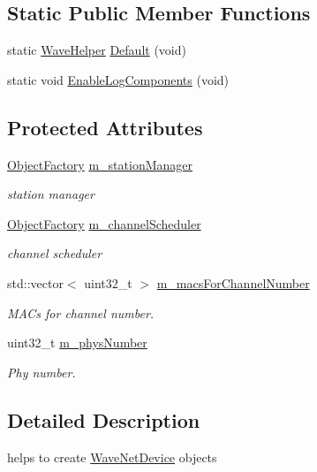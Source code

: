 \subsection*{Static Public Member Functions}
\begin{DoxyCompactItemize}
\item 
static \hyperlink{classns3_1_1WaveHelper}{Wave\+Helper} \hyperlink{classns3_1_1WaveHelper_aa3b90ecb4657cdeaf77e67532dd2e690}{Default} (void)
\item 
static void \hyperlink{classns3_1_1WaveHelper_a9b7510b4aeb982d4a01f2ae829e1ee09}{Enable\+Log\+Components} (void)
\end{DoxyCompactItemize}
\subsection*{Protected Attributes}
\begin{DoxyCompactItemize}
\item 
\hyperlink{classns3_1_1ObjectFactory}{Object\+Factory} \hyperlink{classns3_1_1WaveHelper_ad6f8c0136ece039608e1e8030e4cef14}{m\+\_\+station\+Manager}
\begin{DoxyCompactList}\small\item\em station manager \end{DoxyCompactList}\item 
\hyperlink{classns3_1_1ObjectFactory}{Object\+Factory} \hyperlink{classns3_1_1WaveHelper_ac4708368922b43b2f61a8cdadd9e3b5b}{m\+\_\+channel\+Scheduler}
\begin{DoxyCompactList}\small\item\em channel scheduler \end{DoxyCompactList}\item 
std\+::vector$<$ uint32\+\_\+t $>$ \hyperlink{classns3_1_1WaveHelper_a2c3c091a1b0d1b3f901e33d2849fe817}{m\+\_\+macs\+For\+Channel\+Number}
\begin{DoxyCompactList}\small\item\em M\+A\+Cs for channel number. \end{DoxyCompactList}\item 
uint32\+\_\+t \hyperlink{classns3_1_1WaveHelper_a34634d5d3480ffdd4b9ecaa375d2888f}{m\+\_\+phys\+Number}
\begin{DoxyCompactList}\small\item\em Phy number. \end{DoxyCompactList}\end{DoxyCompactItemize}


\subsection{Detailed Description}
helps to create \hyperlink{classns3_1_1WaveNetDevice}{Wave\+Net\+Device} objects 


